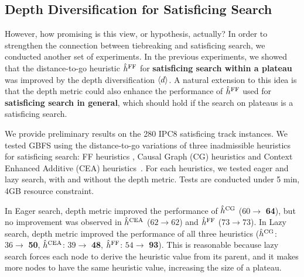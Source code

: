 \subsection{Depth Diversification for Satisficing Search}

However, how promising is this view, or hypothesis, actually?
In order to strengthen the connection between tiebreaking and satisficing search,
we conducted another set of experiments. In the previous experiments, we showed that the distance-to-go
\ff heuristic $\hat{h}^{\text{FF}}$ for \textbf{satisficing search within a plateau} was improved by the depth diversification
${\left<d\right>}$.
% 
A natural extension to this idea is that the depth metric could also enhance the performance of $\hat{h}^{\text{FF}}$ used for
\textbf{satisficing search in general}, which should hold if the search on plateaus is a satisficing search.
% 

We provide preliminary results on the 280 IPC8 satisficing track
instances. We tested GBFS using the distance-to-go variations of three
\sota inadmissible heuristics for satisficing search: FF heuristics
 \cite{Hoffmann01}, Causal Graph (CG) heuristics \cite{Helmert2006} and
Context Enhanced Additive (CEA) heuristics\ \cite{helmert2008unifying}.
For each heuristics, we tested eager and lazy search, with and without
the depth metric.  Tests are conducted under 5 min, 4GB
resource constraint.

In Eager search, depth metric
improved the performance of $\hat{h}^{\text{CG}}$ ($60\rightarrow $ \textbf{64}), but no
improvement was observed in $\hat{h}^{\text{CEA}}$ ($62\rightarrow 62$)
and $\hat{h}^{\text{FF}}$ ($73\rightarrow 73$). In Lazy search, depth metric
improved the performance of all three heuristics
($\hat{h}^{\text{CG}}$: $36\rightarrow $ \textbf{50}, 
 $\hat{h}^{\text{CEA}}$: $39\rightarrow $ \textbf{48}, 
 $\hat{h}^{\text{FF}}$: $54\rightarrow $ \textbf{93}). This is reasonable
because lazy search forces each node to derive the heuristic value from
its parent, and it makes more nodes to have the same heuristic value,
increasing the size of a plateau.

